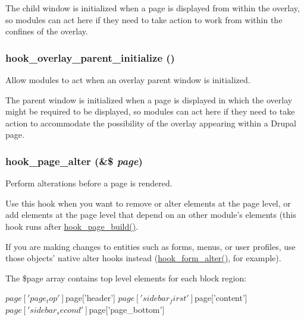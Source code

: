The child window is initialized when a page is displayed from within the overlay, so modules can act here if they need to take action to work from within the confines of the overlay. \hypertarget{group__hooks_ga4f7d60aad2768e7b8fac11839ea9b874}{
\subsubsection[{hook\_\-overlay\_\-parent\_\-initialize}]{\setlength{\rightskip}{0pt plus 5cm}hook\_\-overlay\_\-parent\_\-initialize ()}}
\label{group__hooks_ga4f7d60aad2768e7b8fac11839ea9b874}
Allow modules to act when an overlay parent window is initialized.

The parent window is initialized when a page is displayed in which the overlay might be required to be displayed, so modules can act here if they need to take action to accommodate the possibility of the overlay appearing within a Drupal page. \hypertarget{group__hooks_gaa965aa8f38b48aed1a19c556c199145f}{
\subsubsection[{hook\_\-page\_\-alter}]{\setlength{\rightskip}{0pt plus 5cm}hook\_\-page\_\-alter (\&\$ {\em page})}}
\label{group__hooks_gaa965aa8f38b48aed1a19c556c199145f}
Perform alterations before a page is rendered.

Use this hook when you want to remove or alter elements at the page level, or add elements at the page level that depend on an other module's elements (this hook runs after \hyperlink{group__hooks_ga16d8d8ae818dc759bbe539e16ff5b93b}{hook\_\-page\_\-build()}.

If you are making changes to entities such as forms, menus, or user profiles, use those objects' native alter hooks instead (\hyperlink{group__hooks_ga6df3cea27ae1407aeef4eae5444cb213}{hook\_\-form\_\-alter()}, for example).

The \$page array contains top level elements for each block region: 
\begin{DoxyCode}
   $page['page_top']
   $page['header']
   $page['sidebar_first']
   $page['content']
   $page['sidebar_second']
   $page['page_bottom']
\end{DoxyCode}


